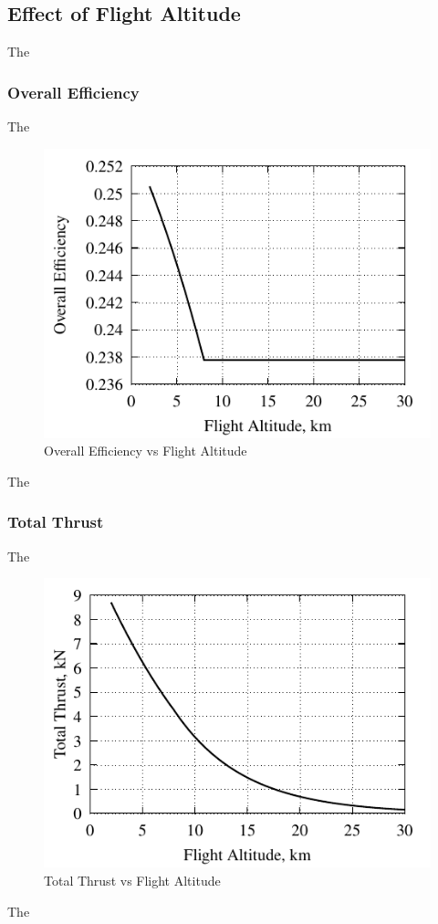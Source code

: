 \documentclass[conf]{new-aiaa} %
\begin{document}
\subsection{Effect of Flight Altitude} %
The

\subsubsection{Overall Efficiency}
The

\begin{figure}[H] %
    \centering
    \includegraphics[]{media/performance_parameter_files/part_d_eta_o.pdf}
    \caption{\label{fig:partdetao}Overall Efficiency vs Flight Altitude}
\end{figure}
The

\subsubsection{Total Thrust}
The

\begin{figure}[H] %
    \centering
    \includegraphics[]{media/performance_parameter_files/part_d_T.pdf}
    \caption{\label{fig:partdt}Total Thrust vs Flight Altitude}
\end{figure}
The
\end{document}
